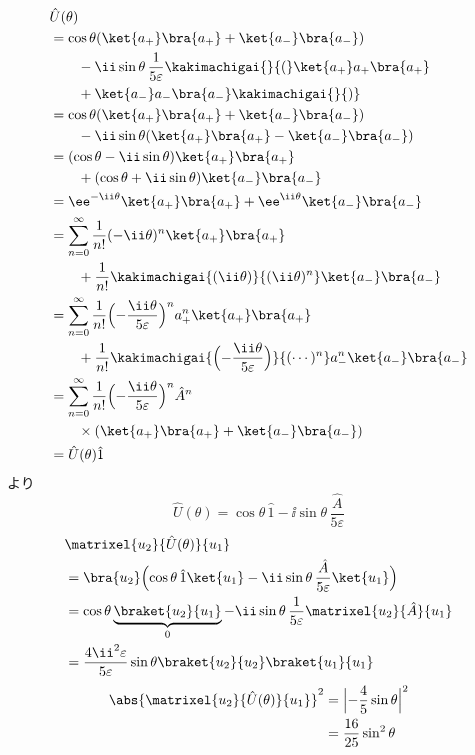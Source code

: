 \begin{align*}
&\hat{U}(\theta)\\
&=\cos\theta(\ket{a_{+}}\bra{a_{+}}+\ket{a_{-}}\bra{a_{-}})\\
&\qquad-\ii\sin\theta\,\frac{1}{5\varepsilon}\kakimachigai{}{(}\ket{a_{+}}a_{+}\bra{a_{+}}\\
&\qquad+\ket{a_{-}}a_{-}\bra{a_{-}}\kakimachigai{}{)}\\
&=\cos\theta(\ket{a_{+}}\bra{a_{+}}+\ket{a_{-}}\bra{a_{-}})\\
&\qquad-\ii\sin\theta(\ket{a_{+}}\bra{a_{+}}-\ket{a_{-}}\bra{a_{-}})\\
&=(\cos\theta-\ii\sin\theta)\ket{a_{+}}\bra{a_{+}}\\
&\qquad+(\cos\theta+\ii\sin\theta)\ket{a_{-}}\bra{a_{-}}\\
&=\ee^{-\ii\theta}\ket{a_{+}}\bra{a_{+}}+\ee^{\ii\theta}\ket{a_{-}}\bra{a_{-}}\\
&=\sum_{n=0}^{\infty}\frac{1}{n!}(-\ii\theta)^{n}\ket{a_{+}}\bra{a_{+}}\\
&\qquad+\frac{1}{n!}\kakimachigai{(\ii\theta)}{(\ii\theta)^{n}}\ket{a_{-}}\bra{a_{-}}\\
&=\sum_{n=0}^{\infty}\frac{1}{n!}\Bigl(-\frac{\ii\theta}{5\varepsilon}\Bigr)^{n}a_{+}^{n}\ket{a_{+}}\bra{a_{+}}\\
&\qquad+\frac{1}{n!}\kakimachigai{\Bigl(-\frac{\ii\theta}{5\varepsilon}\Bigr)}{(\cdots)^{n}}a_{-}^{n}\ket{a_{-}}\bra{a_{-}}\\
&=\sum_{n=0}^{\infty}\frac{1}{n!}\Bigl(-\frac{\ii\theta}{5\varepsilon}\Bigr)^{n}\hat{A}^{n}\\
&\qquad\times(\ket{a_{+}}\bra{a_{+}}+\ket{a_{-}}\bra{a_{-}})\\
&=\hat{U}(\theta)\hat{1}
\end{align*}
より
\[ \hat{U}(\theta)=\cos\theta\,\hat{1}-\ii\sin\theta\,\frac{\hat{A}}{5\varepsilon} \]
\begin{align*}
&\matrixel{u_{2}}{\hat{U}(\theta)}{u_{1}}\\
&=\bra{u_{2}}\Bigl(\cos\theta\,\hat{1}\ket{u_{1}}-\ii\sin\theta\,\frac{\hat{A}}{5\varepsilon}\ket{u_{1}}\Bigr)\\
&=\cos\theta\underbrace{\braket{u_{2}}{u_{1}}}_{0}-\ii\sin\theta\,\frac{1}{5\varepsilon}\matrixel{u_{2}}{\hat{A}}{u_{1}}\\
&=\frac{4\ii^{2}\varepsilon}{5\varepsilon}\sin\theta\braket{u_{2}}{u_{2}}\braket{u_{1}}{u_{1}}
\end{align*}
\begin{align*}
\abs{\matrixel{u_{2}}{\hat{U}(\theta)}{u_{1}}}^{2}&=\Bigl\lvert-\frac{4}{5}\sin\theta\Bigr\rvert^{2}\\
&=\frac{16}{25}\sin^{2}\theta
\end{align*}
